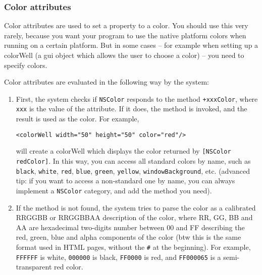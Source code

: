 \subsubsection{Color attributes}
Color attributes are used to set a property to a color.  You should
use this very rarely, because you want your program to use the native
platform colors when running on a certain platform.  But in some cases
-- for example when setting up a colorWell (a gui object which allows
the user to choose a color) -- you need to specify colors.

Color attributes are evaluated in the following way by the system: 
\begin{enumerate}
\item First, the system checks if \texttt{NSColor} responds to the method
\texttt{+xxxColor}, where \texttt{xxx} is the value of the attribute.  If it 
does, the method is invoked, and the result is used as the color.  For
example, 
\begin{verbatim}
<colorWell width="50" height="50" color="red"/>
\end{verbatim}
will create a colorWell which displays the color returned by
\texttt{[NSColor redColor]}.  In this way, you can access all standard 
colors by name, such as \texttt{black}, \texttt{white}, \texttt{red},
\texttt{blue}, \texttt{green}, \texttt{yellow}, \texttt{windowBackground}, etc.
(advanced tip: if you want to access a non-standard one by name, you
can always implement a \texttt{NSColor} category, and add the method
you need).
\item If the method is not found, the system tries to parse the color as 
a calibrated RRGGBB or RRGGBBAA description of the color, where RR,
GG, BB and AA are hexadecimal two-digits number between 00 and FF
describing the red, green, blue and alpha components of the color (btw
this is the same format used in HTML pages, without the \texttt{\#} at
the beginning).  For example, \texttt{FFFFFF} is white,
\texttt{000000} is black, \texttt{FF0000} is red, and \texttt{FF000065} 
is a semi-transparent red color.
\end{enumerate}

